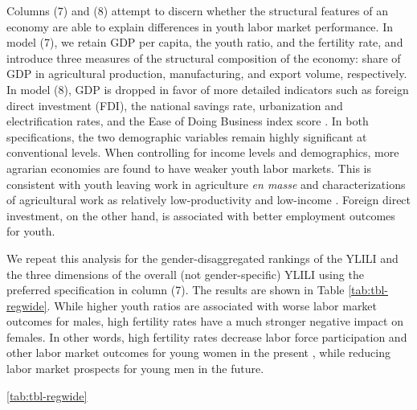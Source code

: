 \documentclass[
  a4paper, twoside, 12pt]{book}
\newcommand{\hlc}[2][color]{}
\begin{document}
Columns (7) and (8) attempt to discern whether the structural features of an economy are able to explain differences in youth labor market performance. In model (7), we retain GDP per capita, the youth ratio, and the fertility rate, and introduce three measures of the structural composition of the economy: share of GDP in agricultural production, manufacturing, and export volume, respectively. In model (8), GDP is dropped in favor of more detailed indicators such as foreign direct investment (FDI), the national savings rate, urbanization and electrification rates, and the Ease of Doing Business index score \autocite[from the][]{worldbank2021a}. In both specifications, the two demographic variables remain highly significant at conventional levels. When controlling for income levels and demographics, more agrarian economies are found to have weaker youth labor markets. This is consistent with youth leaving work in agriculture \emph{en masse} and characterizations of agricultural work as relatively low-productivity and low-income \autocite{filmer2014}. Foreign direct investment, on the other hand, is associated with better employment outcomes for youth.

We repeat this analysis for the gender-disaggregated rankings of the YLILI and the three dimensions of the overall (not gender-specific) YLILI using the preferred specification in column (7). The results are shown in Table \ref{tab:tbl-regwide}. While higher youth ratios are associated with worse labor market outcomes for males, high fertility rates have a much stronger negative impact on females. In other words, high fertility rates decrease labor force participation and other labor market outcomes for young women in the present \autocite[in line with][]{bloom2009}, while reducing labor market prospects for young men in the future.

 \hlc[pink]{Table }\ref{tab:tbl-regwide} \hlc[pink]{also shows that different dimensions of the YLILI correlate with different macroeconomic measures. A high fertility rate, for instance, is associated with lower transition scores, likely reflecting its the detrimental effects of childbirth on female economic participation. On the other hand, richer countries experience slower youth transitions to the labor market---again, because extended periods of inactivity after leaving school is a luxury that youth in lower-income countries cannot afford. In contrast to the overall YLILI score, the working conditions dimension score is predicted by GDP per capita, even after controlling for demographic variables. Thus, even if economic growth is not a solution to all aspects of the youth employment problem, it can still lead to short-term improvements by alleviating youth working poverty, underemployment, and work informality. Finally, education outcomes are shown to be worse for countries with higher youth ratios (possibly via overburdened education systems) and fertility rates (higher dropout rates for females).}
\end{document}
